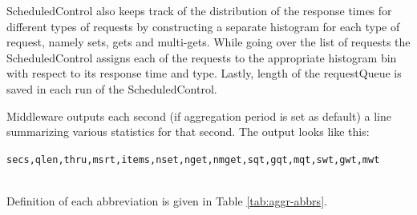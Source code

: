 \documentclass[11pt,a4paper]{article}
\begin{document}
\par ScheduledControl also keeps track of the distribution of the response times for different types of requests by constructing a separate histogram for each type of request, namely sets, gets and multi-gets. While going over the list of requests the ScheduledControl assigns each of the requests to the appropriate histogram bin with respect to its response time and type. Lastly, length of the requestQueue is saved in each run of the ScheduledControl.
\par Middleware outputs each second (if aggregation period is set as default) a line summarizing various statistics for that second. The output looks like this:
\\
\centerline{\texttt{secs,qlen,thru,msrt,items,nset,nget,nmget,sqt,gqt,mqt,swt,gwt,mwt}}
\\
Definition of each abbreviation is given in Table \ref{tab:aggr-abbrs}.
\end{document}
